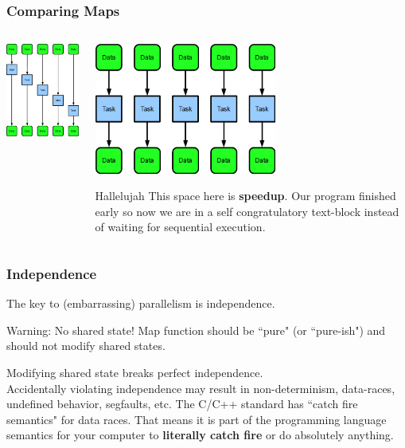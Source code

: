 \documentclass[xcolor=dvipsnames]{beamer}
\begin{document}
		\begin{frame}[fragile] \frametitle{Comparing Maps}
			\begin{columns}
				\begin{column}{0.5\textwidth}
					\includegraphics[width=60mm]{images/map_serial.png}
			    \end{column}
	  			\begin{column}{0.5\textwidth}
					\includegraphics[width=60mm]{images/map_parallel.png}\pause
					\begin{block}{Hallelujah}
						This space here is \textbf{speedup}. Our program finished 
						early so now we are in a self congratulatory text-block 
	                    instead of waiting for sequential execution.
					\end{block}
			     \end{column}
			\end{columns}
		\end{frame}
			
		\begin{frame} \frametitle{Independence}
			The key to (embarrassing) parallelism is independence.\pause
			\begin{alertblock}{Warning: No shared state!}
				Map function should be ``pure" (or ``pure-ish") and should not 
	            modify shared states.
			\end{alertblock}
			Modifying shared state breaks perfect independence.\\Accidentally
			violating independence may result in non-determinism, data-races, 
			undefined behavior, segfaults, etc. \pause The C/C++ standard has 
			``catch fire semantics" for data races. That means it is part of the 
			programming language semantics for your computer to \textbf{literally
			catch fire} or do absolutely anything.
		\end{frame}
			
\end{document}
